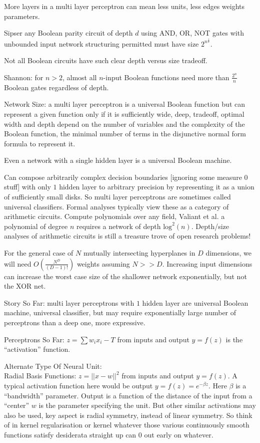 More layers in a multi layer perceptron can mean less units, less edges weights parameters.

Sipser any Boolean parity circuit of depth $d$ using AND, OR, NOT gates with unbounded input network structuring permitted must have size $2^{n^{\frac{1}{d}}}$.

Not all Boolean circuits have such clear depth versus size tradeoff.

Shannon: for $n > 2$, almost all $n$-input Boolean functions need more than $\frac{2^n}{n}$ Boolean gates regardless of depth.

Network Size: a multi layer perceptron is a universal Boolean function but can represent a given function only if it is sufficiently wide, deep, tradeoff, optimal width and depth depend on the number of variables and the complexity of the Boolean function, the minimal number of terms in the disjunctive normal form formula to represent it.

Even a network with a single hidden layer is a universal Boolean machine.

Can compose arbitrarily complex decision boundaries [ignoring some measure $0$ stuff] with only $1$ hidden layer to arbitrary precision by representing it as a union of sufficiently small disks. So multi layer perceptrons are sometimes called universal classifiers. Formal analyses typically view these as a category of arithmetic circuits. Compute polynomials over any field, Valiant et al. a polynomial of degree $n$ requires a network of depth $\text{log}^2 (n)$. Depth/size analyses of arithmetic circuits is still a treasure trove of open research problems!

For the general case of $N$ mutually intersecting hyperplanes in $D$ dimensions, we will need $O \left( \frac{N^D}{(D-1)!} \right)$ weights assuming $N >> D$. Increasing input dimensions can increase the worst case size of the shallower network exponentially, but not the XOR net.

Story So Far: multi layer perceptrons with $1$ hidden layer are universal Boolean machine, universal classifier, but may require exponentially large number of perceptrons than a deep one, more expressive.

Perceptrons So Far: $z = \sum w_i x_i - T$ from inputs and output $y = f(z)$ is the ``activation'' function.

Alternate Type Of Neural Unit: \\
Radial Basis Functions: $z = ||x-w||^2$ from inputs and output $y = f(z)$. A typical activation function here would be output $y = f(z) = e^{- \beta z}$. Here $\beta$ is a ``bandwidth'' parameter. Output is a function of the distance of the input from a ``center'' $w$ is the parameter specifying the unit. But other similar activations may also be used, key aspect is radial symmetry, instead of linear symmetry. So think of in kernel regularisation or kernel whatever those various continuously smooth functions satisfy desiderata straight up can $0$ out early on whatever.

